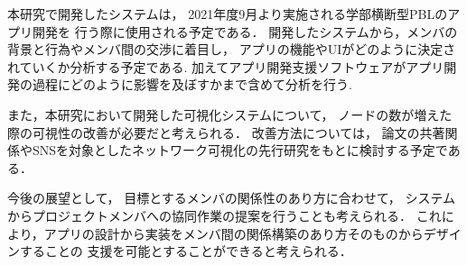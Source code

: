 
本研究で開発したシステムは，
2021年度9月より実施される学部横断型PBLのアプリ開発を
行う際に使用される予定である．
開発したシステムから，メンバの背景と行為やメンバ間の交渉に着目し，
アプリの機能やUIがどのように決定されていくか分析する予定である.
加えてアプリ開発支援ソフトウェアがアプリ開発の過程にどのように影響を及ぼすかまで含めて分析を行う.

また，本研究において開発した可視化システムについて，
ノードの数が増えた際の可視性の改善が必要だと考えられる．
改善方法については，
論文の共著関係やSNSを対象としたネットワーク可視化の先行研究をもとに検討する予定である．

今後の展望として，
目標とするメンバの関係性のあり方に合わせて，
システムからプロジェクトメンバへの協同作業の提案を行うことも考えられる．
これにより，アプリの設計から実装をメンバ間の関係構築のあり方そのものからデザインすることの
支援を可能とすることができると考えられる．
